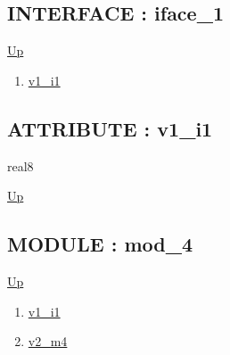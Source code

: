 \subsection*{INTERFACE : iface\_1}
\hypertarget{ecldoc:intest.inintest.example_2.iface_1}{}
\par
\begin{minipage}[t]{\textwidth}
\begin{flushleft}
  
\end{flushleft}
\end{minipage}
\hyperlink{ecldoc:intest.inintest.example_2}{Up} \\
\par
\par
\begin{enumerate}
\item \hyperlink{ecldoc:intest.inintest.example_2.iface_1.v1_i1}{v1\_i1}
\end{enumerate}
\subsection*{ATTRIBUTE : v1\_i1}
\hypertarget{ecldoc:intest.inintest.example_2.iface_1.v1_i1}{}
\par
\begin{minipage}[t]{\textwidth}
\begin{flushleft}
real8  
\end{flushleft}
\end{minipage}
\hyperlink{ecldoc:intest.inintest.example_2.iface_1}{Up} \\
\par
\par

\subsection*{MODULE : mod\_4}
\hypertarget{ecldoc:intest.inintest.example_2.mod_4}{}
\par
\begin{minipage}[t]{\textwidth}
\begin{flushleft}
  
\end{flushleft}
\end{minipage}
\hyperlink{ecldoc:intest.inintest.example_2}{Up} \\
\par
\par
\begin{enumerate}
\item \hyperlink{ecldoc:intest.inintest.example_2.mod_4.v1_i1}{v1\_i1}
\item \hyperlink{ecldoc:intest.inintest.example_2.mod_4.v2_m4}{v2\_m4}
\end{enumerate}
